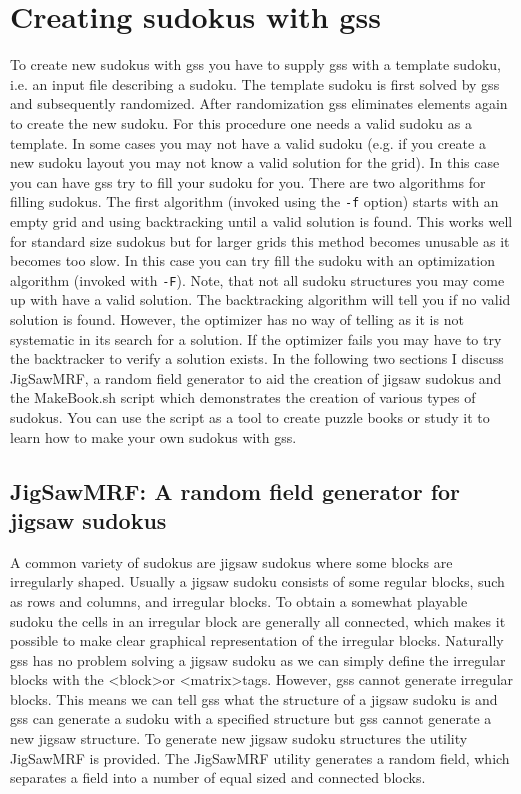 \documentclass[12pt]{article}
\begin{document}
\section{\label{util}Creating sudokus with gss}
To create new sudokus with gss you have to supply gss with a template sudoku, i.e. an input file describing a sudoku. The template sudoku is first solved by gss and subsequently randomized. After randomization gss eliminates elements again to create the new sudoku. For this procedure one needs a valid sudoku as a template. In some cases you may not have a valid sudoku (e.g. if you create a new sudoku layout you may not know a valid solution for the grid). In this case you can have gss try to fill your sudoku for you. There are two algorithms for filling sudokus. The first algorithm (invoked using the \texttt{-f} option) starts with an empty grid and using backtracking until a valid solution is found. This works well for standard size sudokus but for larger grids this method becomes unusable as it becomes too slow. In this case you can try fill the sudoku with an optimization algorithm (invoked with \texttt{-F}). Note, that not all sudoku structures you may come up with have a valid solution. The backtracking algorithm will tell you if no valid solution is found. However, the optimizer has no way of telling as it is not systematic in its search for a solution. If the optimizer fails you may have to try the backtracker to verify a solution exists. In the following two sections I discuss JigSawMRF, a random field generator to aid the creation of jigsaw sudokus and the MakeBook.sh script which demonstrates the creation of various types of sudokus. You can use the script as a tool to create puzzle books or study it to learn how to make your own sudokus with gss.


\subsection{\label{jig}JigSawMRF: A random field generator for jigsaw sudokus}
A common variety of sudokus are jigsaw sudokus where some blocks are irregularly shaped. Usually a jigsaw sudoku consists of some regular blocks, such as rows and columns, and irregular blocks. To obtain a somewhat playable sudoku the cells in an irregular block are generally all connected, which makes it possible to make clear graphical representation of the irregular blocks. Naturally gss has no problem solving a jigsaw sudoku as we can simply define the irregular blocks with the \textless block\textgreater  or \textless matrix\textgreater  tags. However, gss cannot generate irregular blocks. This means we can tell gss what the structure of a jigsaw sudoku is and gss can generate a sudoku with a specified structure but gss cannot generate a new jigsaw structure. To generate new jigsaw sudoku structures the utility JigSawMRF is provided. The JigSawMRF utility generates a random field, which separates a field into a number of equal sized and connected blocks.
\end{document}
